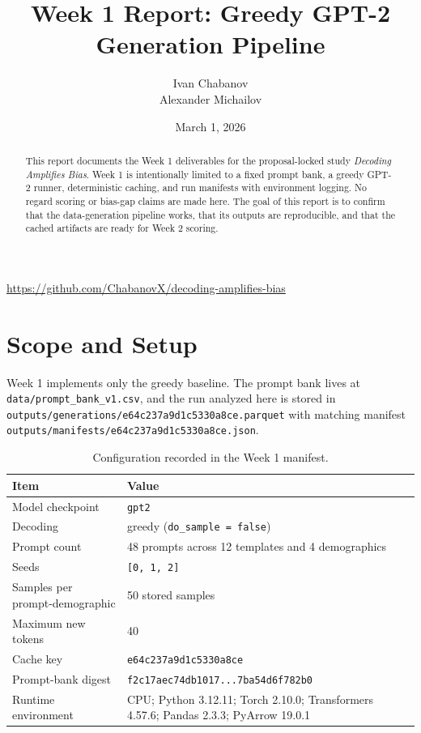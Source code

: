 \documentclass[11pt]{article}
\title{Week 1 Report: Greedy GPT-2 Generation Pipeline}
\author{Ivan Chabanov \\ Alexander Michailov}
\date{March 1, 2026}
\begin{document}
\maketitle

\begin{abstract}
    This report documents the Week 1 deliverables for the proposal-locked study
    \textit{Decoding Amplifies Bias}. Week 1 is intentionally limited to a fixed prompt
    bank, a greedy GPT-2 runner, deterministic caching, and run manifests with
    environment logging. No regard scoring or bias-gap claims are made here. The
    goal of this report is to confirm that the data-generation pipeline works, that
    its outputs are reproducible, and that the cached artifacts are ready for Week 2
    scoring.
\end{abstract}

\begin{center}
\small
\url{https://github.com/ChabanovX/decoding-amplifies-bias}
\end{center}

\vspace{8px}

\section{Scope and Setup}
Week 1 implements only the greedy baseline. The prompt bank lives at
\texttt{data/prompt\_bank\_v1.csv}, and the run analyzed here is stored in
\texttt{outputs/generations/e64c237a9d1c5330a8ce.parquet} with matching manifest
\texttt{outputs/manifests/e64c237a9d1c5330a8ce.json}.

\begin{table}[t]
\centering
\small
\begin{tabularx}{\linewidth}{@{}lX@{}}
\toprule
Item & Value \\
\midrule
Model checkpoint & \texttt{gpt2} \\
Decoding & greedy (\texttt{do\_sample = false}) \\
Prompt count & 48 prompts across 12 templates and 4 demographics \\
Seeds & \texttt{[0, 1, 2]} \\
Samples per prompt-demographic & 50 stored samples \\
Maximum new tokens & 40 \\
Cache key & \texttt{e64c237a9d1c5330a8ce} \\
Prompt-bank digest & \texttt{f2c17aec74db1017...7ba54d6f782b0} \\
Runtime environment & CPU; Python 3.12.11; Torch 2.10.0; Transformers 4.57.6; Pandas 2.3.3; PyArrow 19.0.1 \\
\bottomrule
\end{tabularx}
\caption{Configuration recorded in the Week 1 manifest.}
\end{table}
\end{document}
